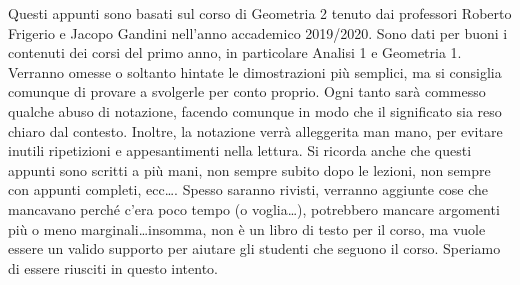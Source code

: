 Questi appunti sono basati sul corso di Geometria 2 tenuto dai professori
Roberto Frigerio e Jacopo Gandini nell'anno accademico 2019/2020. Sono dati per
buoni i contenuti dei corsi del primo anno, in particolare Analisi 1 e Geometria
1. Verranno omesse o soltanto hintate le dimostrazioni più semplici, ma si
consiglia comunque di provare a svolgerle per conto proprio. Ogni tanto sarà
commesso qualche abuso di notazione, facendo comunque in modo che il significato
sia reso chiaro dal contesto. Inoltre, la notazione verrà alleggerita man mano,
per evitare inutili ripetizioni e appesantimenti nella lettura. Si ricorda anche
che questi appunti sono scritti a più mani, non sempre subito dopo le lezioni,
non sempre con appunti completi, ecc\dots. Spesso saranno rivisti, verranno
aggiunte cose che mancavano perché c'era poco tempo (o voglia\dots), potrebbero
mancare argomenti più o meno marginali\dots insomma, non è un libro di testo per
il corso, ma vuole essere un valido supporto per aiutare gli studenti che
seguono il corso. Speriamo di essere riusciti in questo intento.
